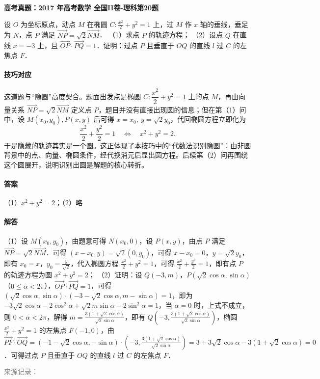 \documentclass[UTF8,a4paper,11pt]{ctexart}
\newenvironment{gaokao}[1]{\par\medskip\noindent\textbf{高考真题：#1}\par\smallskip}{\par\medskip}
\begin{document}
\begin{gaokao}{2017 年高考数学 全国II卷-理科第20题}

设 $O$ 为坐标原点，动点 $M$ 在椭圆 $C:\frac{x^2}{2}+y^2=1$ 上，过 $M$ 作 $x$ 轴的垂线，垂足为 $N$，点 $P$ 满足 $\overrightarrow{NP}=\sqrt{2}\overrightarrow{NM}$．
（1）求点 $P$ 的轨迹方程；
（2）设点 $Q$ 在直线 $x=-3$ 上，且 $\overrightarrow{OP}\cdot\overrightarrow{PQ}=1$．证明：过点 $P$ 且垂直于 $OQ$ 的直线 $l$ 过 $C$ 的左焦点 $F$．

\paragraph{技巧对应}

这道题与“隐圆”高度契合。题面出发点是椭圆 $C:\dfrac{x^2}{2}+y^2=1$ 上的点 $M$，再由向量关系 $\overrightarrow{NP}=\sqrt{2}\overrightarrow{NM}$ 定义点 $P$，题目并没有直接出现圆的信息；但在第（1）问中，设 $M(x_0,y_0),P(x,y)$ 后可得 $x=x_0,\ y=\sqrt{2}y_0$，代回椭圆方程立即化为
\[
\frac{x^2}{2}+\frac{y^2}{2}=1\quad\Longleftrightarrow\quad x^2+y^2=2.
\]
于是隐藏的轨迹其实是一个圆。这正体现了本技巧中的“代数法识别隐圆”：由非圆背景中的点、向量、椭圆条件，经代换消元后显出圆方程。后续第（2）问再围绕这个圆展开，说明识别出圆是解题的核心转折。

\paragraph{答案}

（1）$x^2+y^2=2$；（2）略

\paragraph{解答}

（1）设 $M(x_0,y_0)$，由题意可得 $N(x_0,0)$，设 $P(x,y)$，由点 $P$ 满足 $\overrightarrow{NP}=\sqrt{2}\overrightarrow{NM}$．可得 $(x-x_0,y)=\sqrt{2}(0,y_0)$，可得 $x-x_0=0$，$y=\sqrt{2}y_0$，即有 $x_0=x$，$y_0=\frac{y}{\sqrt{2}}$，代入椭圆方程 $\frac{x^2}{2}+y^2=1$，可得 $\frac{x^2}{2}+\frac{y^2}{2}=1$，即有点 $P$ 的轨迹方程为圆 $x^2+y^2=2$；
（2）证明：设 $Q(-3,m)$，$P(\sqrt{2}\cos\alpha,\sin\alpha)$（$0\le\alpha<2\pi$），$\overrightarrow{OP}\cdot\overrightarrow{PQ}=1$，可得 $(\sqrt{2}\cos\alpha,\sin\alpha)\cdot(-3-\sqrt{2}\cos\alpha,m-\sin\alpha)=1$，即为 $-3\sqrt{2}\cos\alpha-2\cos^2\alpha+\sqrt{2}m\sin\alpha-2\sin^2\alpha=1$，当 $\alpha=0$ 时，上式不成立，则 $0<\alpha<2\pi$，解得 $m=\frac{3(1+\sqrt{2}\cos\alpha)}{\sqrt{2}\sin\alpha}$，即有 $Q(-3,\frac{3(1+\sqrt{2}\cos\alpha)}{\sqrt{2}\sin\alpha})$，椭圆 $\frac{x^2}{2}+y^2=1$ 的左焦点 $F(-1,0)$，由 $\overrightarrow{PF}\cdot\overrightarrow{OQ}=(-1-\sqrt{2}\cos\alpha,-\sin\alpha)\cdot(-3,\frac{3(1+\sqrt{2}\cos\alpha)}{\sqrt{2}\sin\alpha})=3+3\sqrt{2}\cos\alpha-3(1+\sqrt{2}\cos\alpha)=0$．可得过点 $P$ 且垂直于 $OQ$ 的直线 $l$ 过 $C$ 的左焦点 $F$．

\par\smallskip\textcolor{gray}{\footnotesize 来源记录：\texttt{}}

\end{gaokao}
\end{document}
